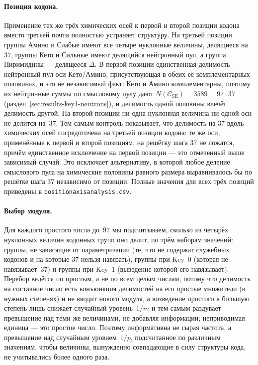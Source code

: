 \documentclass[11pt,a4paper]{article}
\renewcommand{\_}{\origunderscore\allowbreak}
\begin{document}
\paragraph{Позиция кодона.}
Применение тех же трёх химических осей к первой и второй позиции
кодона вместо третьей почти полностью устраняет структуру. На
третьей позиции группы Амино и Слабые имеют все четыре нуклонные
величины, делящиеся на~$37$, группы Кето и Сильные имеют
делящийся нейтронный пул, а группа Пиримидины --- делящееся
$\Delta$. В первой позиции единственная делимость — нейтронный пул оси
Кето/Амино, присутствующая в обеих её комплементарных
половинах, и это не независимый факт: Кето и Амино
комплементарны, поэтому их нейтронные суммы по смысловому пулу
дают
$N(\mathcal{C}_{\mathrm{SE}}) = 3589 = 97 \cdot 37$
(раздел~\ref{sec:results-key1-neutrons}), и делимость одной
половины влечёт делимость другой. На второй позиции ни одна
нуклонная величина ни одной оси не делится на~$37$. Тем самым контроль показывает, что делимость на $37$ вдоль
химических осей сосредоточена на третьей позиции кодона: те же
оси, применённые к первой и второй позициям, на решётку шага
$37$ не ложатся, причём единственное исключение на первой
позиции — это отмеченный выше зависимый случай. Это исключает
альтернативу, в которой любое деление смыслового пула на
химические половины равного размера выравнивалось бы по решётке
шага $37$ независимо от позиции. Полные
значения для всех трёх позиций приведены в
\texttt{position\_axis\_analysis.csv}.

\paragraph{Выбор модуля.}
Для каждого простого числа до~$97$ мы подсчитываем, сколько из
четырёх нуклонных величин кодонных групп оно делит, по трём
наборам значений: группы, не зависящие от параметризации (те,
что не содержат служебных кодонов и на которые $37$ нельзя
навязать), группы при Key~0 (которая не навязывает~$37$) и
группы при Key~1 (выведение которой его навязывает). Перебор
ведётся по простым, а не по всем целым числам, потому что
делимость на составное число есть конъюнкция делимостей на его
простые множители (в нужных степенях) и не вводит нового модуля,
а возведение простого в большую степень лишь снижает случайный
уровень~$1/m$ и тем самым раздувает превышение над теми же
величинами, не добавляя информации; неприводимая единица --- это
простое число. Поэтому информативна не сырая частота, а
превышение над случайным уровнем~$1/p$, подсчитанное по различным
значениям, чтобы величины, вынужденно совпадающие в силу
структуры кода, не учитывались более одного раза.
\end{document}
